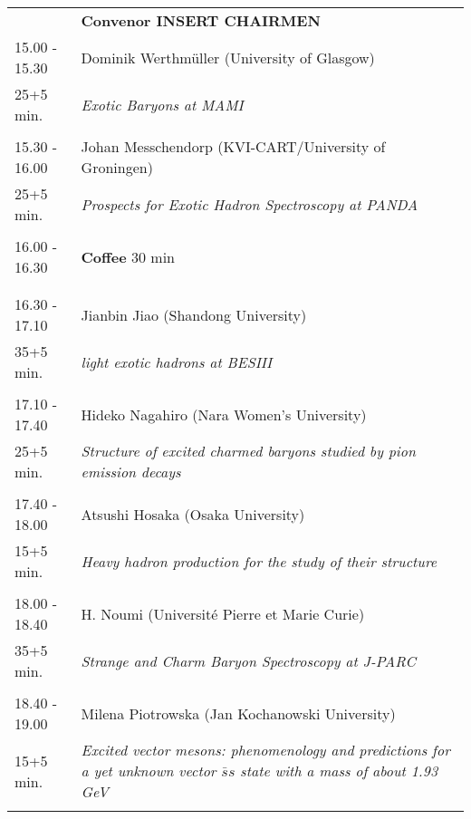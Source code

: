\begin{longtable}{p{3cm}p{13cm}}
&\hfill {\bf Convenor INSERT CHAIRMEN }\\ 
15.00 - 15.30 & Dominik Werthmüller (University of Glasgow)\\ 
25+5 min. & {\it Exotic Baryons at MAMI}\\ 
 & \\ 
15.30 - 16.00 & Johan Messchendorp (KVI-CART/University of Groningen)\\ 
25+5 min. & {\it Prospects for Exotic Hadron Spectroscopy at PANDA}\\ 
 & \\ 
16.00 - 16.30 & {\bf Coffee} \hfill 30 min \\ 
 & \\ 
 & \\ 
16.30 - 17.10 & Jianbin Jiao (Shandong University)\\ 
35+5 min. & {\it light exotic hadrons at BESIII}\\ 
 & \\ 
17.10 - 17.40 & Hideko Nagahiro (Nara Women's University)\\ 
25+5 min. & {\it Structure of excited charmed baryons studied by pion emission decays}\\ 
 & \\ 
17.40 - 18.00 & Atsushi Hosaka (Osaka University)\\ 
15+5 min. & {\it Heavy hadron production for the study of their structure}\\ 
 & \\ 
18.00 - 18.40 & H. Noumi (Université Pierre et Marie Curie)\\ 
35+5 min. & {\it Strange and Charm Baryon Spectroscopy at J-PARC}\\ 
 & \\ 
18.40 - 19.00 & Milena Piotrowska (Jan Kochanowski University)\\ 
15+5 min. & {\it Excited vector mesons: phenomenology and predictions for a yet unknown vector $\bar{s}s$ state with a mass of about 1.93 GeV}\\ 
 & \\ 
\end{longtable}

